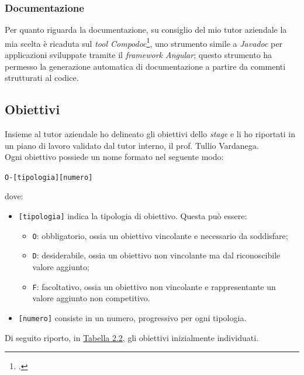 \subsubsection*{Documentazione}
Per quanto riguarda la documentazione, su consiglio del mio tutor aziendale la mia scelta è ricaduta sul \textit{tool Compodoc}\footcite{tec:compodoc}, uno strumento simile a \textit{Javadoc} per applicazioni sviluppate tramite il \textit{framework Angular}; questo strumento ha permesso la generazione automatica di documentazione a partire da commenti strutturati al codice.

\subsection{Obiettivi}

Insieme al tutor aziendale ho delineato gli obiettivi dello \textit{stage} e li ho riportati in un piano di lavoro validato dal tutor interno, il prof. Tullio Vardanega. \\
Ogni obiettivo possiede un nome formato nel seguente modo:
\begin{center}
  \centering
  \texttt{O-[tipologia][numero]}
\end{center} dove:
\begin{itemize}
  \item \texttt{[tipologia]} indica la tipologia di obiettivo. Questa può essere:
  \begin{itemize}
    \item \texttt{O}: obbligatorio, ossia un obiettivo vincolante e necessario da soddisfare;
    \item \texttt{D}: desiderabile, ossia un obiettivo non vincolante ma dal riconoscibile valore aggiunto;
    \item \texttt{F}: facoltativo, ossia un obiettivo non vincolante e rappresentante un valore aggiunto non competitivo.
  \end{itemize}
  \item \texttt{[numero]} consiste in un numero, progressivo per ogni tipologia.
\end{itemize}

Di seguito riporto, in \hyperref[tab:obiettivi-originali]{Tabella 2.2}, gli obiettivi inizialmente individuati.
\newpage

